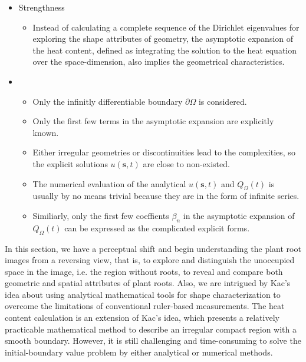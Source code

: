     \begin{itemize}
      \item Strengthness
        \begin{itemize}
          \item Instead of calculating a complete sequence of the Dirichlet eigenvalues for exploring the shape attributes of geometry, the asymptotic expansion of the heat content, defined as integrating the solution to the heat equation over the space-dimension, also implies the geometrical characteristics.  
        \end{itemize}
        
      \item
        \begin{itemize}
          \item Only the infinitly differentiable boundary $\partial \Omega$ is considered.
          \item Only the first few terms in the asymptotic expansion are explicitly known.
          \item Either irregular geometries or discontinuities lead to the complexities, so the explicit solutions $u(\bm{s}, t)$ are close to non-existed.
          \item The numerical evaluation of the analytical $u(\bm{s}, t)$ and $Q_{\Omega}(t)$ is usually by no means trivial because they are in the form of infinite series.
          \item Similiarly, only the first few coeffients $\beta_n$ in the asymptotic expansion of $Q_{\Omega}(t)$ can be expressed as the complicated explicit forms.
        \end{itemize}
        
    \end{itemize}
    




In this section, we have a perceptual shift and begin understanding
the plant root images from a reversing view, that is, to explore and
distinguish the unoccupied space in the image, i.e. the region without
roots, to reveal and compare both geometric and spatial attributes of
plant roots. Also, we are intrigued by Kac's idea about using
analytical mathematical tools for shape characterization to overcome
the limitations of conventional ruler-based measurements. The heat
content calculation is an extension of Kac's idea, which presents a
relatively practicable mathematical method to describe an irregular
compact region with a smooth boundary. However, it is still
challenging and time-consuming to solve the initial-boundary value
problem by either analytical or numerical methods.
